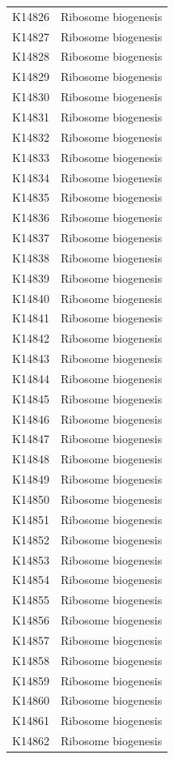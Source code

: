\begin{longtable}{@{}l l@{}}
K14826 & Ribosome biogenesis \\
K14827 & Ribosome biogenesis \\
K14828 & Ribosome biogenesis \\
K14829 & Ribosome biogenesis \\
K14830 & Ribosome biogenesis \\
K14831 & Ribosome biogenesis \\
K14832 & Ribosome biogenesis \\
K14833 & Ribosome biogenesis \\
K14834 & Ribosome biogenesis \\
K14835 & Ribosome biogenesis \\
K14836 & Ribosome biogenesis \\
K14837 & Ribosome biogenesis \\
K14838 & Ribosome biogenesis \\
K14839 & Ribosome biogenesis \\
K14840 & Ribosome biogenesis \\
K14841 & Ribosome biogenesis \\
K14842 & Ribosome biogenesis \\
K14843 & Ribosome biogenesis \\
K14844 & Ribosome biogenesis \\
K14845 & Ribosome biogenesis \\
K14846 & Ribosome biogenesis \\
K14847 & Ribosome biogenesis \\
K14848 & Ribosome biogenesis \\
K14849 & Ribosome biogenesis \\
K14850 & Ribosome biogenesis \\
K14851 & Ribosome biogenesis \\
K14852 & Ribosome biogenesis \\
K14853 & Ribosome biogenesis \\
K14854 & Ribosome biogenesis \\
K14855 & Ribosome biogenesis \\
K14856 & Ribosome biogenesis \\
K14857 & Ribosome biogenesis \\
K14858 & Ribosome biogenesis \\
K14859 & Ribosome biogenesis \\
K14860 & Ribosome biogenesis \\
K14861 & Ribosome biogenesis \\
K14862 & Ribosome biogenesis \\

\end{longtable}
